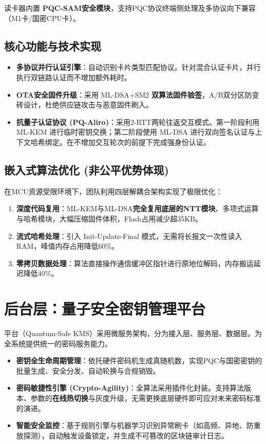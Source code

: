 读卡器内置 \textbf{PQC-SAM安全模块}，支持PQC协议终端侧处理及多协议向下兼容（M1卡/国密CPU卡）。

\subsection{核心功能与技术实现}

\begin{itemize}
	\item \textbf{多协议并行认证引擎}：自动识别卡片类型匹配协议。针对混合认证卡片，并行执行双链路认证而不增加额外耗时。
	\item \textbf{OTA安全固件升级}：采用 ML-DSA+SM2 \textbf{双算法固件验签}，A/B双分区防变砖设计，杜绝供应链攻击与恶意固件刷入。
	\item \textbf{抗量子认证协议 (PQ-Aliro)}：采用2-RTT两轮往返交互模式。第一阶段利用 ML-KEM 进行临时密钥交换；第二阶段使用 ML-DSA 进行双向签名认证与上下文哈希绑定。在不增加交互轮次的前提下完成强身份认证。
\end{itemize}

\subsection{嵌入式算法优化 (非公平优势体现)}
在MCU资源受限环境下，团队利用四层解耦合架构实现了极限优化：
\begin{enumerate}
	\item \textbf{深度代码复用}：ML-KEM与ML-DSA\textbf{完全复用底层的NTT模块}、多项式运算与哈希模块，大幅压缩固件体积，Flash占用减少超35KB。
	\item \textbf{流式哈希处理}：引入 Init-Update-Final 模式，无需将长报文一次性读入RAM，峰值内存占用降低60\%。
	\item \textbf{零拷贝数据处理}：算法直接操作通信缓冲区指针进行原地位解码，内存搬运延迟降低40\%。
\end{enumerate}

\section{后台层：量子安全密钥管理平台}

平台（Quantum-Safe KMS）采用微服务架构，分为接入层、服务层、数据层。为全系统提供统一的密码服务能力。

\begin{itemize}
	\item \textbf{密钥全生命周期管理}：依托硬件密码机生成真随机数，实现PQC与国密密钥的批量生成、安全分发、自动轮换与合规销毁。
	\item \textbf{密码敏捷性引擎 (Crypto-Agility)}：全算法采用插件化封装。支持算法版本、参数的\textbf{在线热切换}与灰度升级，无需更换底层硬件即可应对未来密码标准的演进。
	\item \textbf{智能安全监控}：基于规则引擎与机器学习识别异常刷卡（如高频、异地、防重放探测），自动触发设备锁定，并生成不可篡改的区块链审计日志。
\end{itemize}

